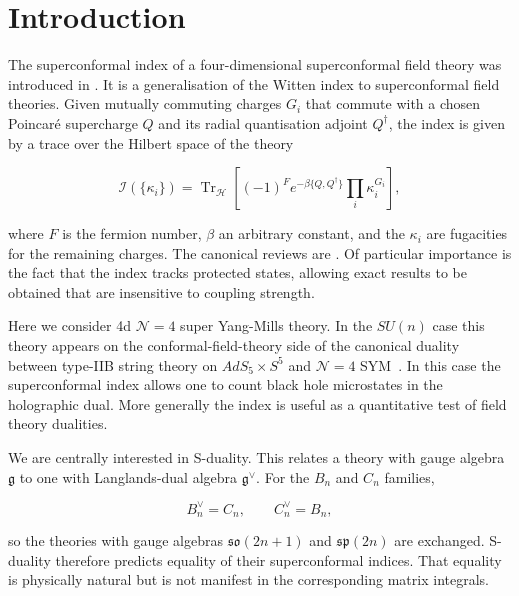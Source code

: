 \section{Introduction}
\label{sec:introduction}
The superconformal index of a four-dimensional superconformal field theory was
introduced in \cite{Romelsberger2006,Kinney2007}. It is a generalisation of the
Witten index to superconformal field theories. Given mutually commuting charges
$G_i$ that commute with a chosen Poincaré supercharge $Q$ and its radial
quantisation adjoint $Q^\dagger$, the index is given by a trace over the Hilbert
space of the theory

\begin{equation}
  \mathcal I(\{\kappa_i\})
  =\operatorname{Tr}_{\mathcal H}
  \left[
    (-1)^F e^{-\beta\{Q,Q^\dagger\}}
    \prod_i \kappa_i^{G_i}
    \right],
  \label{eq:sc-index}
\end{equation}

where $F$ is the fermion number, $\beta$ an arbitrary constant, and the
$\kappa_i$ are fugacities for the remaining charges. The canonical reviews are
\cite{Rastelli:2016tbz,Gadde:2011uv,Gadde:2020yah}. Of particular importance is
the fact that the index tracks protected states, allowing exact results to be
obtained that are insensitive to coupling strength.

Here we consider 4d $\mathcal N=4$ super Yang-Mills theory. In the $SU(n)$ case
this theory appears on the conformal-field-theory side of the canonical duality
between type-IIB string theory on $AdS_5\times S^5$ and $\mathcal N=4$
SYM~\cite{Maldacena:1998}. In this case the superconformal index allows one to
count black hole microstates in the holographic dual.
More generally the index is useful as a quantitative test of field theory
dualities.

We are centrally interested in S-duality. This relates a theory with gauge
algebra $\mathfrak g$ to one with Langlands-dual algebra $\mathfrak g^{\vee}$.
For the $B_n$ and $C_n$ families,

\begin{equation}
  B_n^\vee=C_n,
  \qquad
  C_n^\vee=B_n,
\end{equation}

so the theories with gauge algebras $\mathfrak{so}(2n+1)$ and
$\mathfrak{sp}(2n)$ are exchanged. S-duality therefore predicts equality of
their superconformal indices. That equality is physically natural but is not
manifest in the corresponding matrix integrals.

